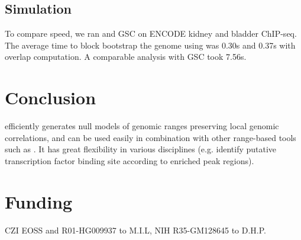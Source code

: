 \subsection{Simulation}

To compare speed, we ran \bootranges and GSC on
ENCODE kidney and bladder ChIP-seq. The average time to
block bootstrap the genome using \bootranges was 0.30s and
0.37s with overlap computation. A comparable analysis with GSC took
7.56s.


\vspace*{-20pt}
\section{Conclusion}

\bootranges efficiently generates null models of genomic ranges preserving 
local genomic correlations, and can be used easily in combination with
other range-based tools such as \plyranges.
It has great flexibility in various disciplines (e.g. identify
putative transcription factor binding site according to enriched peak
regions).


\vspace*{-20pt}

\section*{Funding}
CZI EOSS and R01-HG009937 to M.I.L, NIH R35-GM128645 to D.H.P.

\vspace*{-20pt}

